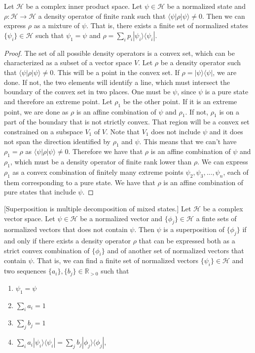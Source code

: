 \documentclass[10pt,twocolumn, nofootinbib]{revtex4-2}
\def\>{\rangle}
\def\<{\langle}
\begin{document}
\begin{prop}\label{prop_decomposition}
	Let $\mathcal{H}$ be a complex inner product space. Let $\psi \in \mathcal{H}$ be a normalized state and $\rho : \mathcal{H} \to \mathcal{H}$ a density operator of finite rank such that $\<\psi|\rho|\psi\>\neq 0$. Then we can express $\rho$ as a mixture of $\psi$. That is, there exists a finite set of normalized states $\{\psi_i\} \in \mathcal{H}$ such that $\psi_1 = \psi$ and $\rho = \sum_i p_i |\psi_i\>\<\psi_i|$.
\end{prop}

\begin{proof}
	The set of all possible density operators is a convex set, which can be characterized as a subset of a vector space $V$. Let $\rho$ be a density operator such that $\<\psi|\rho|\psi\>\neq 0$. This will be a point in the convex set. If $\rho = |\psi\>\<\psi|$, we are done. If not, the two elements will identify a line, which must intersect the boundary of the convex set in two places. One must be $\psi$, since $\psi$ is a pure state and therefore an extreme point. Let $\rho_1$ be the other point. If it is an extreme point, we are done as $\rho$ is an affine combination of $\psi$ and $\rho_1$. If not, $\rho_1$ is on a part of the boundary that is not strictly convex. That region will be a convex set constrained on a subspace $V_1$ of $V$. Note that $V_1$ does not include $\psi$ and it does not span the direction identified by $\rho_1$ and $\psi$. This means that we can't have $\rho_1 = \rho$ as $\<\psi|\rho|\psi\>\neq 0$. Therefore we have that $\rho$ is an affine combination of $\psi$ and $\rho_1$, which must be a density operator of finite rank lower than $\rho$. We can express $\rho_1$ as a convex combination of finitely many extreme points $\psi_2, \psi_3, ..., \psi_n$, each of them corresponding to a pure state. We have that $\rho$ is an affine combination of pure states that include $\psi$.
\end{proof}

\begin{prop}\label{prop_superpositionIsDecomposition}[Superposition is multiple decomposition of mixed states.]
Let $\mathcal{H}$ be a complex vector space. Let $\psi \in \mathcal{H}$ be a normalized vector and $\{\phi_j\} \in \mathcal{H}$ a finte sets of normalized vectors that does not contain $\psi$. Then $\psi$ is a superposition of $\{\phi_j\}$ if and only if there exists a density operator $\rho$ that can be expressed both as a strict convex combination of $\{\phi_i\}$ and of another set of normalized vectors that contain $\psi$. That is, we can find a finite set of normalized vectors $\{\psi_i\} \in \mathcal{H}$ and two sequences $\{a_i\}, \{b_j\} \in \mathbb{R}_{>0}$ such that
\begin{enumerate}
	\item $\psi_1 = \psi$
	\item $\sum_i a_i = 1$
	\item $\sum_j b_j = 1$
	\item $\sum_i a_i |\psi_i\>\<\psi_i| = \sum_j b_j |\phi_j\>\<\phi_j|$,
\end{enumerate}
\end{prop}
\end{document}
